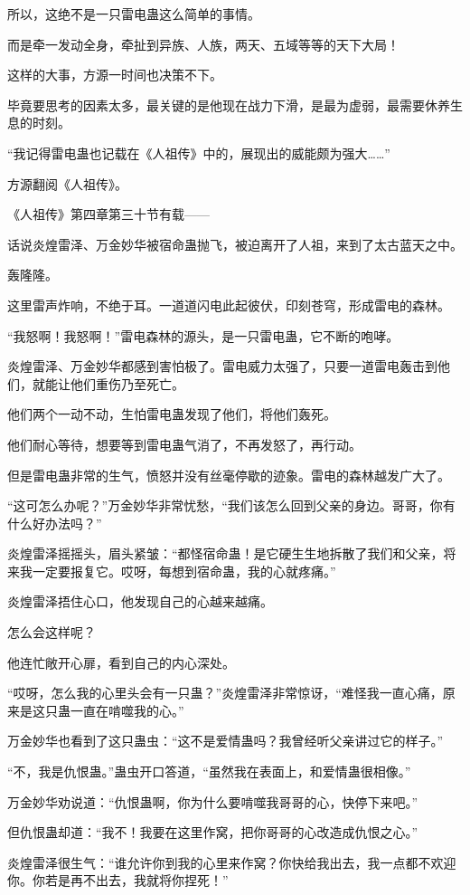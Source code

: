 \begin{this_body}
所以，这绝不是一只雷电蛊这么简单的事情。

而是牵一发动全身，牵扯到异族、人族，两天、五域等等的天下大局！

这样的大事，方源一时间也决策不下。

毕竟要思考的因素太多，最关键的是他现在战力下滑，是最为虚弱，最需要休养生息的时刻。

“我记得雷电蛊也记载在《人祖传》中的，展现出的威能颇为强大……”

方源翻阅《人祖传》。

《人祖传》第四章第三十节有载——

话说炎煌雷泽、万金妙华被宿命蛊抛飞，被迫离开了人祖，来到了太古蓝天之中。

轰隆隆。

这里雷声炸响，不绝于耳。一道道闪电此起彼伏，印刻苍穹，形成雷电的森林。

“我怒啊！我怒啊！”雷电森林的源头，是一只雷电蛊，它不断的咆哮。

炎煌雷泽、万金妙华都感到害怕极了。雷电威力太强了，只要一道雷电轰击到他们，就能让他们重伤乃至死亡。

他们两个一动不动，生怕雷电蛊发现了他们，将他们轰死。

他们耐心等待，想要等到雷电蛊气消了，不再发怒了，再行动。

但是雷电蛊非常的生气，愤怒并没有丝毫停歇的迹象。雷电的森林越发广大了。

“这可怎么办呢？”万金妙华非常忧愁，“我们该怎么回到父亲的身边。哥哥，你有什么好办法吗？”

炎煌雷泽摇摇头，眉头紧皱：“都怪宿命蛊！是它硬生生地拆散了我们和父亲，将来我一定要报复它。哎呀，每想到宿命蛊，我的心就疼痛。”

炎煌雷泽捂住心口，他发现自己的心越来越痛。

怎么会这样呢？

他连忙敞开心扉，看到自己的内心深处。

“哎呀，怎么我的心里头会有一只蛊？”炎煌雷泽非常惊讶，“难怪我一直心痛，原来是这只蛊一直在啃噬我的心。”

万金妙华也看到了这只蛊虫：“这不是爱情蛊吗？我曾经听父亲讲过它的样子。”

“不，我是仇恨蛊。”蛊虫开口答道，“虽然我在表面上，和爱情蛊很相像。”

万金妙华劝说道：“仇恨蛊啊，你为什么要啃噬我哥哥的心，快停下来吧。”

但仇恨蛊却道：“我不！我要在这里作窝，把你哥哥的心改造成仇恨之心。”

炎煌雷泽很生气：“谁允许你到我的心里来作窝？你快给我出去，我一点都不欢迎你。你若是再不出去，我就将你捏死！”


\end{this_body}
